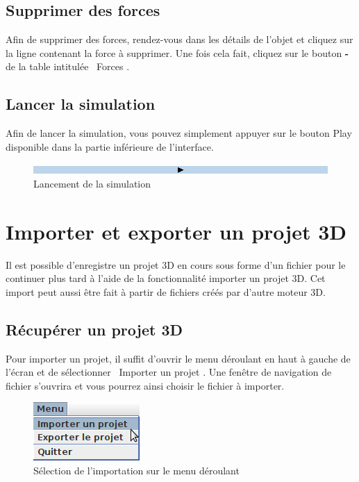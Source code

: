 \documentclass[11pt]{report}
\begin{document}
\section{Supprimer des forces}

Afin de supprimer des forces, rendez-vous dans les détails de l'objet et cliquez sur la ligne contenant la force à supprimer. Une fois cela fait,
cliquez sur le bouton \textbf{-} de la table intitulée \flqq\ Forces \frqq.

\section{Lancer la simulation}

Afin de lancer la simulation, vous pouvez simplement appuyer sur le bouton Play disponible dans la partie inférieure de l'interface.

\begin{figure}[h]
  \centering
  \includegraphics[width=16cm]{./btn_play.png}
  \caption{Lancement de la simulation}
\end{figure}

\chapter{Importer et exporter un projet 3D}

Il est possible d'enregistre un projet 3D en cours sous forme d'un fichier pour le continuer plus tard à l'aide de 
la fonctionnalité importer un projet 3D. Cet import peut aussi être fait à partir de fichiers créés par d'autre moteur 3D.

\section{Récupérer un projet 3D}

Pour importer un projet, il suffit d'ouvrir le menu déroulant en haut à gauche de l'écran et de sélectionner \flqq\ Importer un projet \frqq.
Une fenêtre de navigation de fichier s'ouvrira et vous pourrez ainsi choisir le fichier à importer.

\begin{figure}[h]
  \centering
  \includegraphics{./menu_imp.png}
  \caption{Sélection de l'importation sur le menu déroulant}
\end{figure}
\end{document}
